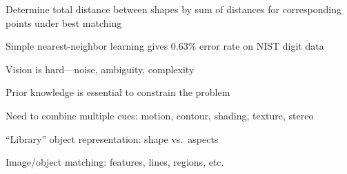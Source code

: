 \documentclass{article}
\begin{document}
\begin{huge}


Determine total distance between shapes by sum of distances for
corresponding points under best matching

\textwidth
{}

Simple nearest-neighbor learning gives 0.63\% error rate on NIST digit data



Vision is hard---noise, ambiguity, complexity

Prior knowledge is essential to constrain the problem

Need to combine multiple cues: motion, contour, shading, texture, stereo

``Library'' object representation: shape vs.~aspects

Image/object matching: features, lines, regions, etc.




\end{huge}
\end{document}
